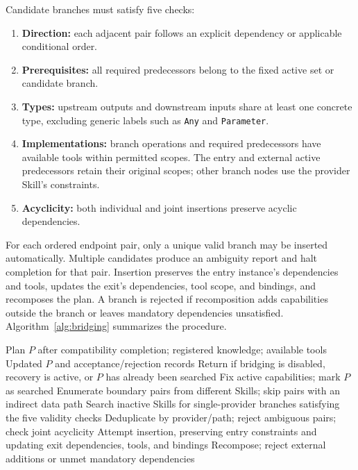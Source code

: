 Candidate branches must satisfy five checks:
\begin{enumerate}
\item \textbf{Direction:} each adjacent pair follows an explicit dependency or applicable conditional order.
\item \textbf{Prerequisites:} all required predecessors belong to the fixed active set or candidate branch.
\item \textbf{Types:} upstream outputs and downstream inputs share at least one concrete type, excluding generic labels such as \texttt{Any} and \texttt{Parameter}.
\item \textbf{Implementations:} branch operations and required predecessors have available tools within permitted scopes. The entry and external active predecessors retain their original scopes; other branch nodes use the provider Skill's constraints.
\item \textbf{Acyclicity:} both individual and joint insertions preserve acyclic dependencies.
\end{enumerate}
For each ordered endpoint pair, only a unique valid branch may be inserted automatically. Multiple candidates produce an ambiguity report and halt completion for that pair. Insertion preserves the entry instance's dependencies and tools, updates the exit's dependencies, tool scope, and bindings, and recomposes the plan. A branch is rejected if recomposition adds capabilities outside the branch or leaves mandatory dependencies unsatisfied. Algorithm~\ref{alg:bridging} summarizes the procedure.

\begin{algorithm}[t]
\caption{Directed Bridging from a Single Provider}
\label{alg:bridging}
\begin{algorithmic}[1]
\Require Plan $P$ after compatibility completion; registered knowledge; available tools
\Ensure Updated $P$ and acceptance/rejection records
\State Return if bridging is disabled, recovery is active, or $P$ has already been searched
\State Fix active capabilities; mark $P$ as searched
\State Enumerate boundary pairs from different Skills; skip pairs with an indirect data path
\State Search inactive Skills for single-provider branches satisfying the five validity checks
\State Deduplicate by provider/path; reject ambiguous pairs; check joint acyclicity
\State Attempt insertion, preserving entry constraints and updating exit dependencies, tools, and bindings
\State Recompose; reject external additions or unmet mandatory dependencies
\end{algorithmic}
\end{algorithm}

